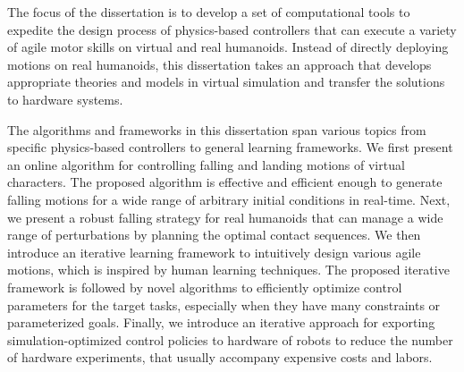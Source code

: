 
The focus of the dissertation is to develop a set of computational tools to
expedite the design process of physics-based controllers that can execute a
variety of agile motor skills on virtual and real humanoids.
Instead of directly deploying motions on real humanoids, this dissertation takes
an approach that develops appropriate theories and models in virtual simulation
and  transfer the solutions to hardware systems.

The algorithms and frameworks in this dissertation span various topics from
specific physics-based controllers to general learning frameworks.
We first present an online algorithm for controlling falling and landing
motions of virtual characters.
The proposed algorithm is effective and efficient enough to generate falling
motions for a wide range of arbitrary initial conditions in real-time.
Next, we present a robust falling strategy for real humanoids that can manage
a wide range of perturbations by planning the optimal contact sequences.
We then introduce an iterative learning framework to intuitively design various
agile motions, which is inspired by human learning techniques.
The proposed iterative framework is followed by novel algorithms to
efficiently optimize control parameters for the target tasks, especially when
they have many constraints or parameterized goals.
Finally, we introduce an iterative approach for exporting simulation-optimized
control policies to hardware of robots to reduce the number of hardware
experiments, that usually accompany expensive costs and labors.





